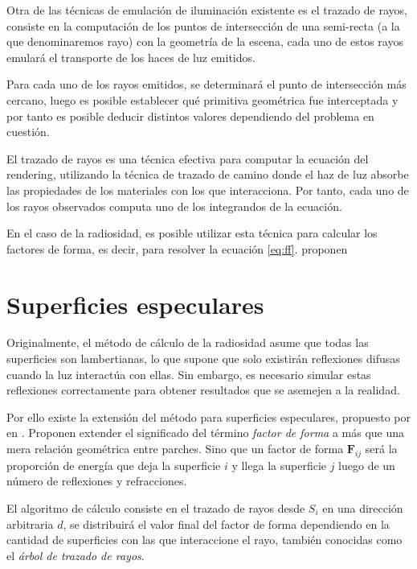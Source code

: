 Otra de las técnicas de emulación de iluminación existente es el trazado de rayos, consiste en la computación de los puntos de intersección de una semi-recta (a la que denominaremos rayo) con la geometría de la escena, cada uno de estos rayos emulará el transporte de los haces de luz emitidos.

Para cada uno de los rayos emitidos, se determinará el punto de intersección más cercano, luego es posible establecer qué primitiva geométrica fue interceptada y por tanto es posible deducir distintos valores dependiendo del problema en cuestión.

El trazado de rayos es una técnica efectiva \cite{Kajiya} para computar la ecuación del rendering, utilizando la técnica de trazado de camino donde el haz de luz absorbe las propiedades de los materiales con los que interacciona. Por tanto, cada uno de los rayos observados computa uno de los integrandos de la ecuación.

En el caso de la radiosidad, es posible utilizar esta técnica para calcular los factores de forma, es decir, para resolver la ecuación \eqref{eq:ff}. \citeauthor{Greenberg} proponen

\section{Superficies especulares}

Originalmente, el método de cálculo de la radiosidad asume que todas las superficies son lambertianas, lo que supone que solo existirán reflexiones difusas cuando la luz interactúa con ellas. Sin embargo, es necesario simular estas reflexiones correctamente para obtener resultados que se asemejen a la realidad.

Por ello existe la extensión del método para superficies especulares, propuesto por \citeauthor{Sillion} en \citeyear{Sillion}. Proponen extender el significado del término \textit{factor de forma} a más que una mera relación geométrica entre parches. Sino que un factor de forma $\mathbf{F}_{ij}$ será la proporción de energía que deja la superficie $i$ y llega la superficie $j$ luego de un número de reflexiones y refracciones.

El algoritmo de cálculo consiste en el trazado de rayos desde $S_{i}$ en una dirección arbitraria $d$, se distribuirá el valor final del factor de forma dependiendo en la cantidad de superficies con las que interaccione el rayo, también conocidas como el \textit{árbol de trazado de rayos}.

